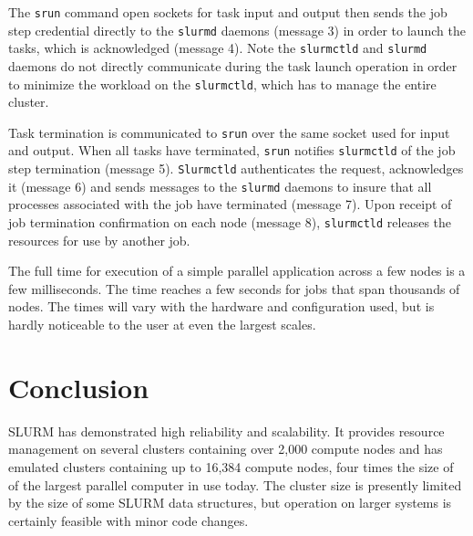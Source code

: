 \documentclass{../common/acm}
\begin{document}
The {\tt srun} command open sockets for task input and output then
sends the job step credential directly to the {\tt slurmd} daemons
(message 3) in order to launch the tasks, which is acknowledged
(message 4).
Note the {\tt slurmctld} and {\tt slurmd} daemons do not directly
communicate during the task launch operation in order to minimize the
workload on the {\tt slurmctld}, which has to manage the entire
cluster.

Task termination is communicated to {\tt srun} over the same
socket used for input and output.
When all tasks have terminated, {\tt srun} notifies {\tt slurmctld}
of the job step termination (message 5).
{\tt Slurmctld} authenticates the request, acknowledges it
(message 6) and sends messages to the {\tt slurmd} daemons to
insure that all processes associated with the job have
terminated (message 7).
Upon receipt of job termination confirmation on each node (message 8),
{\tt slurmctld} releases the resources for use by another job.

The full time for execution of a simple parallel application across
a few nodes is a few milliseconds.
The time reaches a few seconds for jobs that span thousands of
nodes.
The times will vary with the hardware and configuration used,
but is hardly noticeable to the user at even the largest scales.

\section{Conclusion}

SLURM has demonstrated high reliability and scalability.
It provides resource management on several clusters containing
over 2,000 compute nodes and has emulated clusters containing
up to 16,384 compute nodes, four times the size of of the
largest parallel computer in use today.
The cluster size is presently limited by the size of some SLURM
data structures, but operation on larger systems is certainly
feasible with minor code changes.

\raggedright



\end{document}
